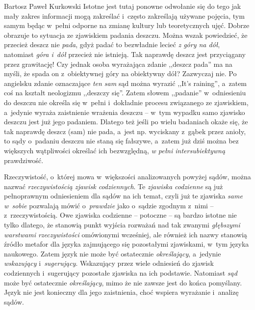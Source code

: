 \begin{artplenv}{Bartosz Paweł Kurkowski}
Istotne jest tutaj ponowne odwołanie się do tego jak mały zakres informacji mogą zakreślać i~często zakreślają używane
pojęcia, tym samym będąc w~pełni odporne na zmianę kultury lub teoretycznych ujęć. Dobrze obrazuje to sytuacja ze
zjawiskiem padania deszczu. Można wszak powiedzieć, że przecież deszcz nie \textit{pada}, gdyż padać to bezwładnie
lecieć \textit{z góry na dół}, natomiast \textit{góra i~dół }przecież nie istnieją. Tak naprawdę deszcz jest
przyciągany przez grawitację! Czy jednak osoba wyrażająca zdanie ,,deszcz pada'' ma na myśli, że spada on z~obiektywnej
góry na obiektywny dół? Zazwyczaj nie. Po angielsku zdanie oznaczające \textit{ten sam }sąd można wyrazić ,,It’s
raining'', a~zatem coś na kształt neologizmu ,,deszczy się''. Zatem słowem ,,padanie'' w~odniesieniu do deszczu nie określa
się w~pełni i~dokładnie procesu związanego ze zjawiskiem, a~jedynie wyraża zaistnienie wrażenia deszczu -- w~tym wypadku
samo zjawisko deszczu jest już jego padaniem. Dlatego też jeśli po wielu badaniach okaże się, że tak naprawdę deszcz
(sam) nie pada, a~jest np. wyciskany z~gąbek przez anioły, to sądy o~padaniu deszczu nie staną się fałszywe, a~zatem
już dziś można bez większych wątpliwości określać ich bezwzględną, \textit{w pełni intersubiektywną} prawdziwość.


Rzeczywistość, o~której mowa w~większości analizowanych powyżej sądów, można nazwać \textit{rzeczywistością zjawisk
codziennych}. Te \textit{zjawiska codzienne} są już pełnoprawnym odniesieniem dla sądów na ich temat, czyli już te
zjawiska \textit{same w~sobie} pozwalają mówić o~\textit{prawdzie} jako o~sądzie zgodnym z~nimi -- z~rzeczywistością.
Owe zjawiska codzienne -- potoczne -- są bardzo istotne nie tylko dlatego, że stanowią punkt wyjścia rozważań nad tak
zwanymi \textit{głębszymi warstwami rzeczywistości} omówionymi wcześniej, ale również ich nazwy stanowią źródło metafor
dla języka zajmującego się pozostałymi zjawiskami, w~tym języka naukowego. Zatem język nie może być ostatecznie
\textit{określający}, a~jedynie \textit{wskazujący }i~\textit{sugerujący}. Wskazujący przez wiele odniesień do zjawisk
codziennych i~sugerujący pozostałe zjawiska na ich podstawie. Natomiast \textit{sąd} może być ostatecznie
\textit{określający}, mimo że nie zawsze jest do końca pomyślany. Język nie jest konieczny dla jego zaistnienia, choć
wspiera wyrażanie i~analizę sądów.



\end{artplenv}
